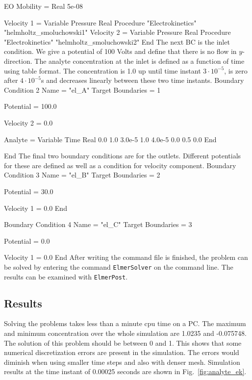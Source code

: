   EO Mobility = Real 5e-08 

  Velocity 1 = Variable Pressure
      Real Procedure  "Electrokinetics" "helmholtz_smoluchowski1"
  Velocity 2 = Variable Pressure
      Real Procedure  "Electrokinetics" "helmholtz_smoluchowski2"
End
\ttend
%
The next BC is the inlet condition. We give a potential of 100 Volts
and define that there is no flow in $y$-direction. The analyte
concentration at the inlet is defined as a function of time using
table format. The concentration is 1.0 up until time instant $3\cdot
10^{-5}$, is zero after $4\cdot 10^{-5}$s and decreases linearly
between these two time instants.
%
\ttbegin
Boundary Condition 2
  Name = "el_A"
  Target Boundaries = 1

  Potential = 100.0

  Velocity 2 = 0.0

  Analyte = Variable Time
    Real
      0.0      1.0
      3.0e-5   1.0
      4.0e-5   0.0
      0.5      0.0
    End

End
\ttend
% 
The final two boundary conditions are for the outlets. Different
potentials for these are defined as well as a condition for velocity
component.
%
\ttbegin
Boundary Condition 3
  Name = "el_B"
  Target Boundaries = 2

  Potential = 30.0

  Velocity 1 = 0.0
End

Boundary Condition 4
  Name = "el_C"
  Target Boundaries = 3

  Potential = 0.0 

  Velocity 1 = 0.0
End
\ttend
%
After writing the command file is finished, the problem can be solved
by entering the command \texttt{ElmerSolver} on the command line. The
results can be examined with \texttt{ElmerPost}.


\subsection*{Results}

Solving the problems takes less than a minute cpu time on a PC. The
maximum and minimum concentration over the whole simulation are 1.0235
and -0.075748. The solution of this problem should be between 0 and
1. This shows that some numerical discretization errors are present in
the simulation. The errors would diminish when using smaller time steps
and also with denser mesh. Simulation results at the time
instant of 0.00025 seconds are shown in Fig.~\ref{fig:analyte_ek}.


